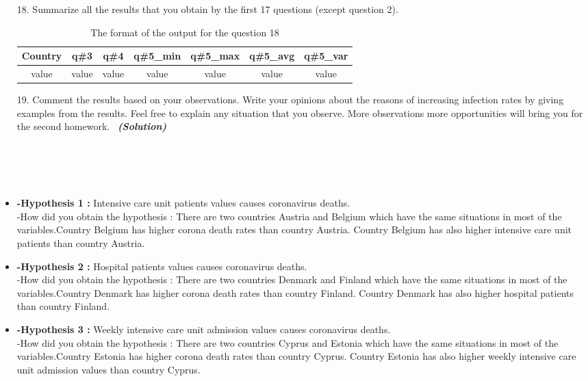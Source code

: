 \documentclass[a4 paper]{article}
\numberwithin{equation}{section}
\newcommand{\solution}{~\newline\textbf{\textit{(Solution)}} }
\newcommand{\0}{\mathbf{0}}
\begin{document}
\begin{itemize}
\begin{table}[ht]
\begin{tabular}{c c c c}
			\hline %
		\end{tabular}\label{table:nonlin}%
	\end{table}
	\item[18. ] Summarize all the results that you obtain by the first 17 questions (except question 2). 
	\begin{table}[ht]
		\caption{The format of the output for the question 18} %
		\centering  %
		\begin{tabular}{c c c c c c c}%
			\hline\hline       %
			Country & q\#3 & q\#4 & q\#5\_min &  q\#5\_max & q\#5\_avg &  q\#5\_var  \\ 
			[0.5ex]%
			\hline      %
			 value & value & value & value & value & value & value\\%

			\hline %
		\end{tabular}\label{table:nonlin}%
	\end{table}
	\item[19. ] Comment the results based on your observations. Write your opinions about the reasons of increasing infection rates by giving examples from the results. Feel free to explain any situation that you observe. More observations more opportunities will bring you for the second homework. 
	\solution\\\\\\\\\

	\item\textbf{-Hypothesis 1 :} Intensive care unit patients values causes coronavirus deaths.\\
        -How did you obtain the hypothesis : There are two countries Austria and Belgium which have the same situations in most of the variables.Country Belgium has higher corona death rates than country Austria. Country Belgium has also higher intensive care unit patients than country Austria.
    \item\textbf{-Hypothesis 2 :} Hospital patients values causes coronavirus deaths.\\
        -How did you obtain the hypothesis : There are two countries Denmark and Finland which have the same situations in most of the variables.Country Denmark has higher corona death rates than country Finland. Country Denmark has also higher hospital patients than country Finland.
    \item\textbf{-Hypothesis 3 :} Weekly intensive care unit admission values causes coronavirus deaths.\\
        -How did you obtain the hypothesis : There are two countries Cyprus and Estonia which have the same situations in most of the variables.Country Estonia has higher corona death rates than country Cyprus. Country Estonia has also higher weekly intensive care unit admission values than country Cyprus.


\end{itemize}
\end{document}
